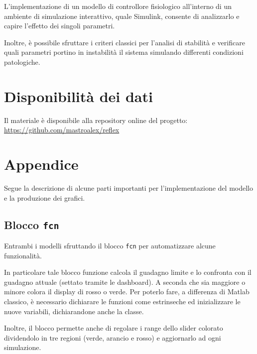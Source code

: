 L'implementazione di un modello di controllore fisiologico all'interno di un ambiente di simulazione interattivo, quale Simulink, consente di analizzarlo e capire l'effetto dei singoli parametri. 

Inoltre, è possibile sfruttare i criteri classici per l'analisi di stabilità e verificare quali parametri portino in instabilità il sistema simulando differenti condizioni patologiche. 

\raggedbottom
\section*{Disponibilità dei dati}

Il materiale è disponibile alla repository online del progetto: \url{https://github.com/mastroalex/reflex}


\raggedbottom
\printbibliography[title=Riferimenti]

\clearpage
\onecolumn
\section*{Appendice}

Segue la descrizione di alcune parti importanti per l'implementazione del modello e la produzione dei grafici.

\subsection{Blocco \texttt{fcn}}
\label{sec:fcn}

Entrambi i modelli sfruttando il blocco \texttt{fcn} per automatizzare alcune funzionalità. 

In particolare tale blocco funzione calcola il guadagno limite e lo confronta con il guadagno attuale (settato tramite le dashboard). A seconda che sia maggiore o minore colora il display di rosso o verde. Per poterlo fare, a differenza di Matlab classico, è necessario dichiarare le funzioni come estrinseche ed inizializzare le nuove variabili, dichiarandone anche la classe.

Inoltre, il blocco permette anche di regolare i range dello slider colorato dividendolo in tre regioni (verde, arancio e rosso) e aggiornarlo ad ogni simulazione.

